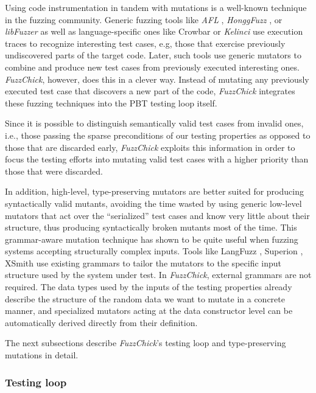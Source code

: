 \documentclass[acmsmall, anonymous]{acmart}
\newcommand{\fuzzchick}{\textit{FuzzChick}\xspace}
\begin{document}
Using code instrumentation in tandem with mutations is a well-known technique in
the fuzzing community.
%
Generic fuzzing tools like \emph{AFL} \cite{afl}, \emph{HonggFuzz}
\cite{honggfuzz}, or \emph{libFuzzer} \citeyearpar{libfuzzer} as well as
language-specific ones like Crowbar \cite{dolan2017testing} or \emph{Kelinci}
\cite{kersten2017poster} use execution traces to recognize interesting test
cases, e.g, those that exercise previously undiscovered parts of the target
code.
%
Later, such tools use generic mutators to combine and produce new test cases
from previously executed interesting ones.
%
\fuzzchick, however, does this in a clever way.
%
Instead of mutating any previously executed test case that discovers a new part
of the code, \fuzzchick integrates these fuzzing techniques into the PBT testing
loop itself.


Since it is possible to distinguish semantically valid test cases from invalid
ones, i.e., those passing the sparse preconditions of our testing properties as
opposed to those that are discarded early, \fuzzchick exploits this information
in order to focus the testing efforts into mutating valid test cases with a
higher priority than those that were discarded.


In addition, high-level, type-preserving mutators are better suited for
producing syntactically valid mutants, avoiding the time wasted by using generic
low-level mutators that act over the ``serialized'' test cases and know very
little about their structure, thus producing syntactically broken mutants most
of the time.
%
This grammar-aware mutation technique has shown to be quite useful when fuzzing
systems accepting structurally complex inputs.
%
Tools like LangFuzz \cite{holler2012fuzzing}, Superion \cite{wang2019superion},
XSmith \cite{xsmith} use existing grammars to tailor the mutators to the
specific input structure used by the system under test.
%
In \fuzzchick, external grammars are not required.
%
The data types used by the inputs of the testing properties already describe the
structure of the random data we want to mutate in a concrete manner, and
specialized mutators acting at the data constructor level can be automatically
derived directly from their definition.

The next subsections describe \fuzzchick's testing loop and type-preserving
mutations in detail.

\subsubsection{Testing loop}
\end{document}
